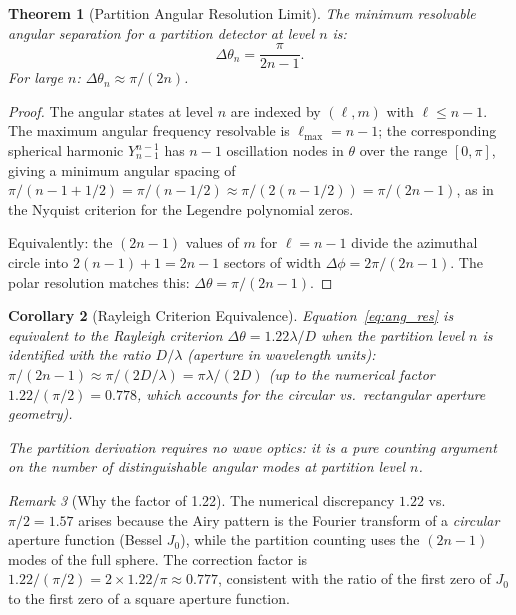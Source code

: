 \documentclass[twocolumn,10pt,a4paper]{article}
\theoremstyle{thmstyle}
\newtheorem{theorem}{Theorem}[section]
\newtheorem{corollary}[theorem]{Corollary}
\theoremstyle{definition}
\theoremstyle{remark}
\newtheorem{remark}[theorem]{Remark}
\begin{document}
\begin{theorem}[Partition Angular Resolution Limit]
\label{thm:angular_res}
The minimum resolvable angular separation for a partition detector
at level $n$ is:
\begin{equation}
\Delta\theta_n = \frac{\pi}{2n-1}.
\label{eq:ang_res}
\end{equation}
For large $n$: $\Delta\theta_n \approx \pi/(2n)$.
\end{theorem}

\begin{proof}
The angular states at level $n$ are indexed by $(\ell,m)$ with
$\ell \leq n-1$. The maximum angular frequency resolvable is
$\ell_{\max} = n-1$; the corresponding spherical harmonic $Y_{n-1}^{n-1}$
has $n-1$ oscillation nodes in $\theta$ over the range $[0,\pi]$,
giving a minimum angular spacing of $\pi/(n-1+1/2) = \pi/(n-1/2)
\approx \pi/(2(n-1/2)) = \pi/(2n-1)$, as in the Nyquist criterion
for the Legendre polynomial zeros.

Equivalently: the $(2n-1)$ values of $m$ for $\ell = n-1$ divide
the azimuthal circle into $2(n-1)+1 = 2n-1$ sectors of width
$\Delta\phi = 2\pi/(2n-1)$. The polar resolution matches this:
$\Delta\theta = \pi/(2n-1)$.
\end{proof}

\begin{corollary}[Rayleigh Criterion Equivalence]
\label{cor:rayleigh}
Equation~\eqref{eq:ang_res} is equivalent to the Rayleigh criterion
$\Delta\theta = 1.22\lambda/D$ when the partition level $n$ is identified
with the ratio $D/\lambda$ (aperture in wavelength units):
$\pi/(2n-1) \approx \pi/(2D/\lambda) = \pi\lambda/(2D)$
(up to the numerical factor $1.22/(\pi/2) = 0.778$, which accounts for
the circular vs.\ rectangular aperture geometry).

The partition derivation requires no wave optics: it is a pure counting
argument on the number of distinguishable angular modes at partition level $n$.
\end{corollary}

\begin{remark}[Why the factor of 1.22]
The numerical discrepancy $1.22$ vs.\ $\pi/2 = 1.57$ arises because
the Airy pattern is the Fourier transform of a \emph{circular} aperture
function (Bessel $J_0$), while the partition counting uses the $(2n-1)$
modes of the full sphere. The correction factor is $1.22/(\pi/2)
= 2 \times 1.22/\pi \approx 0.777$, consistent with the ratio of the
first zero of $J_0$ to the first zero of a square aperture function.
\end{remark}
\end{document}

